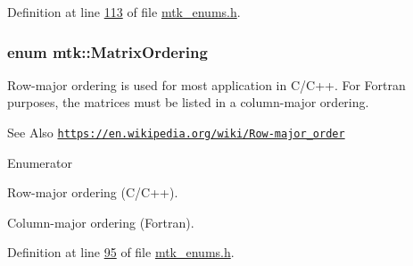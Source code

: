 Definition at line \hyperlink{mtk__enums_8h_source_l00113}{113} of file \hyperlink{mtk__enums_8h_source}{mtk\-\_\-enums.\-h}.

\hypertarget{group__c02-enums_ga622801bd9f912d0f976c3e383f5f581c}{
\subsubsection[{Matrix\-Ordering}]{\setlength{\rightskip}{0pt plus 5cm}enum {\bf mtk\-::\-Matrix\-Ordering}}}\label{group__c02-enums_ga622801bd9f912d0f976c3e383f5f581c}
Row-\/major ordering is used for most application in C/\-C++. For Fortran purposes, the matrices must be listed in a column-\/major ordering.

\begin{DoxySeeAlso}{See Also}
\href{https://en.wikipedia.org/wiki/Row-major_order}{\tt https\-://en.\-wikipedia.\-org/wiki/\-Row-\/major\-\_\-order} 
\end{DoxySeeAlso}
\begin{Desc}
\item[Enumerator]\par
\begin{description}
\item[{\em 
\hypertarget{group__c02-enums_ga622801bd9f912d0f976c3e383f5f581cabc55178ac16eb1ce89b5f3ab915a91f3}{R\-O\-W\-\_\-\-M\-A\-J\-O\-R}\label{group__c02-enums_ga622801bd9f912d0f976c3e383f5f581cabc55178ac16eb1ce89b5f3ab915a91f3}
}]Row-\/major ordering (C/\-C++). \item[{\em 
\hypertarget{group__c02-enums_ga622801bd9f912d0f976c3e383f5f581ca7c11989c132253fb76b8f6b1314f7e13}{C\-O\-L\-\_\-\-M\-A\-J\-O\-R}\label{group__c02-enums_ga622801bd9f912d0f976c3e383f5f581ca7c11989c132253fb76b8f6b1314f7e13}
}]Column-\/major ordering (Fortran). \end{description}
\end{Desc}


Definition at line \hyperlink{mtk__enums_8h_source_l00095}{95} of file \hyperlink{mtk__enums_8h_source}{mtk\-\_\-enums.\-h}.

